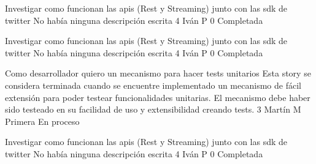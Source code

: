 		{Investigar como funcionan las apis (Rest y Streaming) junto con las sdk de twitter} %
		{No había ninguna descripción escrita} %
		{4} %
		{Iván P} %
		{0} %
		{Completada} %

		{Investigar como funcionan las apis (Rest y Streaming) junto con las sdk de twitter} %
		{No había ninguna descripción escrita} %
		{4} %
		{Iván P} %
		{0} %
		{Completada} %

\vspace{20pt}

			{Como desarrollador quiero un mecanismo para hacer tests unitarios} %
			{Esta story se considera terminada cuando se encuentre implementado un mecanismo de fácil extensión para poder testear funcionalidades unitarias. } %
			{El mecanismo debe haber sido testeado en su facilidad de uso y extensibilidad creando tests.} %
			{3} %
			{Martín M} %
			{Primera} %
			{En proceso} %

		{Investigar como funcionan las apis (Rest y Streaming) junto con las sdk de twitter} %
		{No había ninguna descripción escrita} %
		{4} %
		{Iván P} %
		{0} %
		{Completada} %
